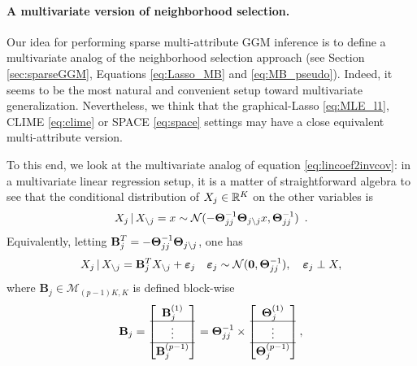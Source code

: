 \paragraph*{A  multivariate version  of neighborhood  selection.}  Our
idea for performing sparse multi-attribute  GGM inference is to define
a  multivariate   analog  of   the  neighborhood   selection  approach
\cite{2006_AS_Meinshausen} (see Section \ref{sec:sparseGGM}, Equations
\eqref{eq:Lasso_MB} and \eqref{eq:MB_pseudo}). Indeed,  it seems to be
the   most   natural   and  convenient   setup   toward   multivariate
generalization.   Nevertheless,  we  think  that  the  graphical-Lasso
\eqref{eq:MLE_l1},  CLIME \eqref{eq:clime}  or SPACE  \eqref{eq:space}
settings may have a close equivalent multi-attribute version.

To  this  end,  we  look   at  the  multivariate  analog  of  equation
\eqref{eq:lincoef2invcov}: in a  multivariate linear regression setup,
it is a matter of straightforward  algebra to see that the conditional
distribution of $X_j\in\mathbb{R}^K$ on the other variables is
\begin{equation*}
  X_j \, |\,  X_{\backslash j}  = x \sim  \mathcal{N}(- \boldsymbol\Theta_{jj}^{-1}\boldsymbol\Theta_{j
    \backslash j} x , \boldsymbol\Theta_{jj}^{-1})\enskip.
\end{equation*} 
Equivalently,     letting      $\displaystyle     \mathbf{B}_j^T     =
-\boldsymbol\Theta_{jj}^{-1} \boldsymbol\Theta_{j\backslash j}$, one has
\begin{equation*}
  X_j \, |\, X_{\backslash j} = \mathbf{B}_j^T X_{\backslash j} +
  \boldsymbol\varepsilon_j \quad \boldsymbol\varepsilon_j
  \sim \mathcal{N}(\mathbf{0},\boldsymbol\Theta_{jj}^{-1}), \quad \boldsymbol\varepsilon_j \perp X,
\end{equation*}
where $\mathbf{B}_j\in\mathcal{M}_{(p-1)K,K}$ is defined block-wise
\begin{equation*}
  \mathbf{B}_j = \begin{bmatrix}
    \mathbf{B}_j^{(1)} \\ \hline
    \vdots \\ \hline
    \mathbf{B}_j^{(p-1)} \\ 
  \end{bmatrix} = \boldsymbol\Theta_{jj}^{-1} \times \begin{bmatrix}
    \boldsymbol\Theta_j^{(1)} \\ \hline
    \vdots \\ \hline
    \boldsymbol\Theta_j^{(p-1)} \\ 
  \end{bmatrix},
\end{equation*}
